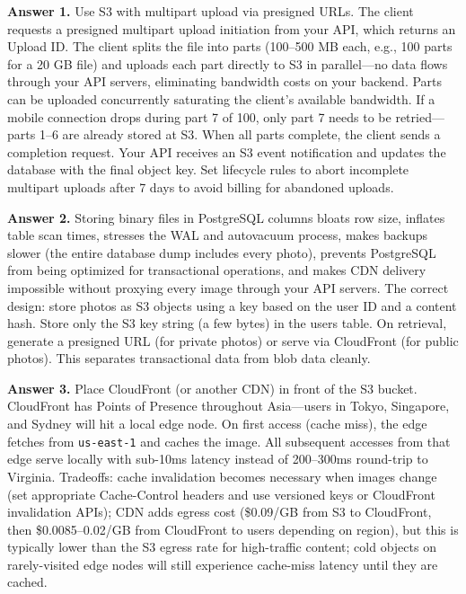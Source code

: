 \documentclass[11pt,a4paper]{article}
\begin{document}
\begin{answerbox}

\textbf{Answer 1.} Use S3 with multipart upload via presigned URLs. The client requests a presigned multipart upload initiation from your API, which returns an Upload ID. The client splits the file into parts (100--500 MB each, e.g., 100 parts for a 20 GB file) and uploads each part directly to S3 in parallel---no data flows through your API servers, eliminating bandwidth costs on your backend. Parts can be uploaded concurrently saturating the client's available bandwidth. If a mobile connection drops during part 7 of 100, only part 7 needs to be retried---parts 1--6 are already stored at S3. When all parts complete, the client sends a completion request. Your API receives an S3 event notification and updates the database with the final object key. Set lifecycle rules to abort incomplete multipart uploads after 7 days to avoid billing for abandoned uploads.

\medskip
\textbf{Answer 2.} Storing binary files in PostgreSQL columns bloats row size, inflates table scan times, stresses the WAL and autovacuum process, makes backups slower (the entire database dump includes every photo), prevents PostgreSQL from being optimized for transactional operations, and makes CDN delivery impossible without proxying every image through your API servers. The correct design: store photos as S3 objects using a key based on the user ID and a content hash. Store only the S3 key string (a few bytes) in the users table. On retrieval, generate a presigned URL (for private photos) or serve via CloudFront (for public photos). This separates transactional data from blob data cleanly.

\medskip
\textbf{Answer 3.} Place CloudFront (or another CDN) in front of the S3 bucket. CloudFront has Points of Presence throughout Asia---users in Tokyo, Singapore, and Sydney will hit a local edge node. On first access (cache miss), the edge fetches from \texttt{us-east-1} and caches the image. All subsequent accesses from that edge serve locally with sub-10ms latency instead of 200--300ms round-trip to Virginia. Tradeoffs: cache invalidation becomes necessary when images change (set appropriate Cache-Control headers and use versioned keys or CloudFront invalidation APIs); CDN adds egress cost (\$0.09/GB from S3 to CloudFront, then \$0.0085--0.02/GB from CloudFront to users depending on region), but this is typically lower than the S3 egress rate for high-traffic content; cold objects on rarely-visited edge nodes will still experience cache-miss latency until they are cached.


\end{answerbox}
\end{document}
